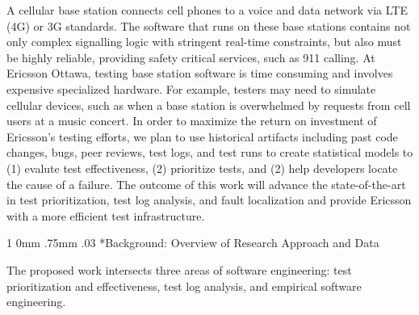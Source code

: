 \documentclass[12pt, letterpaper]{article}
\makeatletter
\renewcommand{\section}{\@startsection
{section}%
{1}%
{0mm}%
{.75mm}
{.03\baselineskip}%
{\normalfont\large\bf} %
}
\makeatother
\begin{document}
\fancyhead{}
\pagestyle{fancy}
\renewcommand{\headrulewidth}{0pt}

\begin{center}
\begin{LARGE}
\noindent
{}
\end{LARGE}
\end{center}




A cellular base station connects cell phones to a voice and data network via
LTE (4G) or 3G standards. The software that runs on these base stations
contains not only complex signalling logic with stringent real-time
constraints, but also must be highly reliable, providing safety critical
services, such as 911 calling. At Ericsson Ottawa, testing base station
software is time consuming and involves expensive specialized hardware. For
example, testers may need to simulate cellular devices, such as when a base
station is overwhelmed by requests from cell users at a music concert. In
order to maximize the return on investment of Ericsson's testing efforts, we
plan to use historical artifacts including past code changes, bugs, peer
reviews, test logs, and test runs to create statistical models to (1) evalute
test effectiveness, (2) prioritize tests, and (2) help developers locate the
cause of a failure. The outcome of this work will advance the state-of-the-art
in test prioritization, test log analysis, and fault localization and provide
Ericsson with a more efficient test infrastructure.

\section*{Background: Overview of Research Approach and Data}

The proposed work intersects three areas of software engineering: test
prioritization and effectiveness, test log analysis, and empirical software engineering. 
\end{document}
